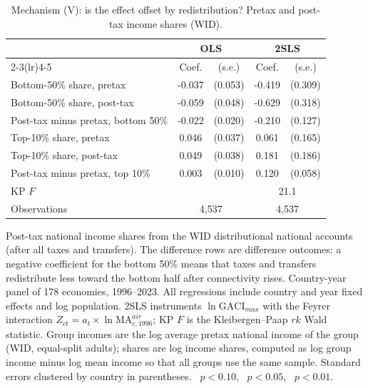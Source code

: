 \begin{table}[H]
\centering
\caption{Mechanism (V): is the effect offset by redistribution? Pretax and post-tax income shares (WID).}
\label{tab:redistribution}
\begin{threeparttable}
\small
\begin{tabular}{lcccc}
\toprule
 & \multicolumn{2}{c}{OLS} & \multicolumn{2}{c}{2SLS} \\
\cmidrule(lr){2-3}\cmidrule(lr){4-5}
 & Coef. & (s.e.) & Coef. & (s.e.) \\
\midrule
Bottom-50\% share, pretax & -0.037 & (0.053) & -0.419 & (0.309) \\
Bottom-50\% share, post-tax & -0.059 & (0.048) & -0.629\sym{**} & (0.318) \\
Post-tax minus pretax, bottom 50\% & -0.022 & (0.020) & -0.210 & (0.127) \\
Top-10\% share, pretax & 0.046 & (0.037) & 0.061 & (0.165) \\
Top-10\% share, post-tax & 0.049 & (0.038) & 0.181 & (0.186) \\
Post-tax minus pretax, top 10\% & 0.003 & (0.010) & 0.120\sym{**} & (0.058) \\
\midrule
KP $F$ & & & \multicolumn{2}{c}{21.1} \\
Observations & \multicolumn{2}{c}{4{,}537} & \multicolumn{2}{c}{4{,}537} \\
\bottomrule
\end{tabular}
\begin{tablenotes}\small
\item Post-tax national income shares from the WID distributional national accounts (after all taxes and transfers). The difference rows are difference outcomes: a negative coefficient for the bottom 50\% means that taxes and transfers redistribute less toward the bottom half after connectivity rises. Country-year panel of 178 economies, 1996--2023. All regressions include country and year fixed effects and log population. 2SLS instruments $\ln\mathrm{GACI}_{max}$ with the Feyrer interaction $Z_{ct}=a_t\times\ln\mathrm{MA}^{air}_{c,1996}$; KP $F$ is the Kleibergen--Paap $rk$ Wald statistic. Group incomes are the log average pretax national income of the group (WID, equal-split adults); shares are log income shares, computed as log group income minus log mean income so that all groups use the same sample. Standard errors clustered by country in parentheses. \sym{*}~$p<0.10$, \sym{**}~$p<0.05$, \sym{***}~$p<0.01$.
\end{tablenotes}
\end{threeparttable}
\end{table}


